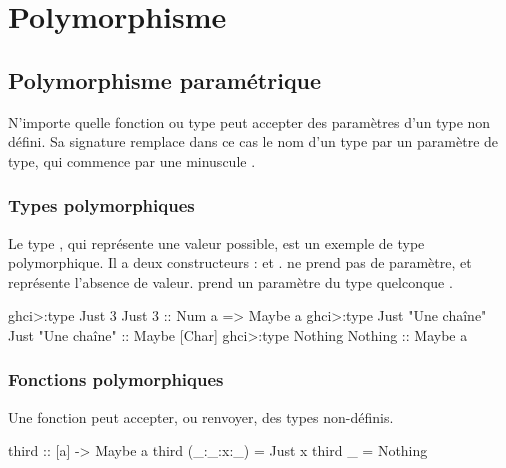 \section{ Polymorphisme}
\label{polymorphism}

\subsection{Polymorphisme paramétrique}

N'importe quelle fonction  ou type  peut accepter des paramètres d'un type non défini. Sa signature remplace dans ce cas le nom d'un type par un paramètre de type, qui commence par une minuscule .

\subsubsection{Types polymorphiques}

Le type , qui représente une valeur possible, est un exemple de type polymorphique. Il a deux constructeurs :  et .  ne prend pas de paramètre, et représente l'absence de valeur.  prend un paramètre du type quelconque .

\begin{haskellcode}
ghci>:type Just 3
Just 3 :: Num a => Maybe a
ghci>:type Just "Une chaîne"
Just "Une chaîne" :: Maybe [Char]
ghci>:type Nothing
Nothing :: Maybe a
\end{haskellcode}

\subsubsection{Fonctions polymorphiques}

Une fonction peut accepter, ou renvoyer, des types non-définis.

\begin{haskellcode}
third :: [a] -> Maybe a
third (_:_:x:_) = Just x
third _ = Nothing
\end{haskellcode}

